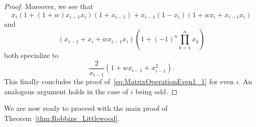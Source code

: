 \documentclass[ALCO, Unicode]{cedram}
\begin{document}
\begin{proof}
		Moreover, we see that
		\begin{equation*}
			x_i (1+(1+w) x_{i-1} x_i) (1+x_{i-1}) + x_{i-1} (1-x_i) (1+w x_i+x_{i-1} x_i)  
		\end{equation*}
		and
		\begin{equation*}
			(x_{i-1}+x_i+w x_{i-1} x_i) \left(1+ (-1)^n \prod_{k=1}^{n} x_k \right)
		\end{equation*}
		both specialize to
		\begin{equation*}
			\frac{2}{x_{i-1}} (1+ w x_{i-1}+ x_{i-1}^2).
		\end{equation*}
		This finally concludes the proof of~\eqref{eq:MatrixOperationEven1_1} for even $i$. An analogous argument holds in the case of $i$ being odd.
	\end{proof}
	
	We are now ready to proceed with the main proof of Theorem~\ref{thm:Robbins_Littlewood}.
	
\end{document}
